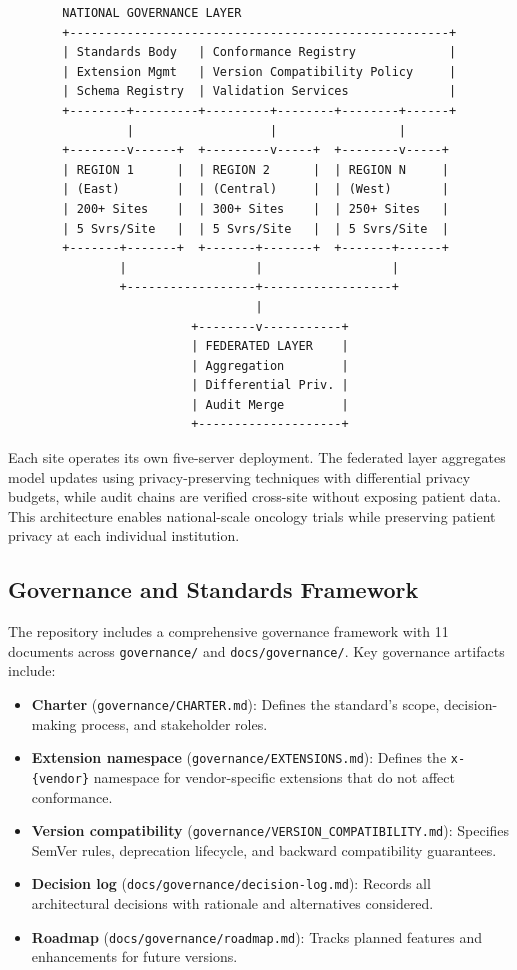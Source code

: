 \documentclass{article}
\begin{document}
\begin{figure}[H]
\begin{verbatim}
  NATIONAL GOVERNANCE LAYER
  +-----------------------------------------------------+
  | Standards Body   | Conformance Registry             |
  | Extension Mgmt   | Version Compatibility Policy     |
  | Schema Registry  | Validation Services              |
  +--------+---------+---------+--------+--------+------+
           |                   |                 |
  +--------v------+  +---------v-----+  +--------v-----+
  | REGION 1      |  | REGION 2      |  | REGION N     |
  | (East)        |  | (Central)     |  | (West)       |
  | 200+ Sites    |  | 300+ Sites    |  | 250+ Sites   |
  | 5 Svrs/Site   |  | 5 Svrs/Site   |  | 5 Svrs/Site  |
  +-------+-------+  +-------+-------+  +-------+------+
          |                  |                  |
          +------------------+------------------+
                             |
                    +--------v-----------+
                    | FEDERATED LAYER    |
                    | Aggregation        |
                    | Differential Priv. |
                    | Audit Merge        |
                    +--------------------+
\end{verbatim}
\end{figure}

Each site operates its own five-server deployment. The federated layer aggregates model updates using privacy-preserving techniques with differential privacy budgets, while audit chains are verified cross-site without exposing patient data. This architecture enables national-scale oncology trials while preserving patient privacy at each individual institution.

\subsection{Governance and Standards Framework}

The repository includes a comprehensive governance framework with 11 documents across \texttt{governance/} and \texttt{docs/governance/}. Key governance artifacts include:

\begin{itemize}[leftmargin=*]
\item \textbf{Charter} (\texttt{governance/CHARTER.md}): Defines the standard's scope, decision-making process, and stakeholder roles.
\item \textbf{Extension namespace} (\texttt{governance/EXTENSIONS.md}): Defines the \texttt{x-\{vendor\}} namespace for vendor-specific extensions that do not affect conformance.
\item \textbf{Version compatibility} (\texttt{governance/VERSION\_COMPATIBILITY.md}): Specifies SemVer rules, deprecation lifecycle, and backward compatibility guarantees.
\item \textbf{Decision log} (\texttt{docs/governance/decision-log.md}): Records all architectural decisions with rationale and alternatives considered.
\item \textbf{Roadmap} (\texttt{docs/governance/roadmap.md}): Tracks planned features and enhancements for future versions.
\end{itemize}
\end{document}
